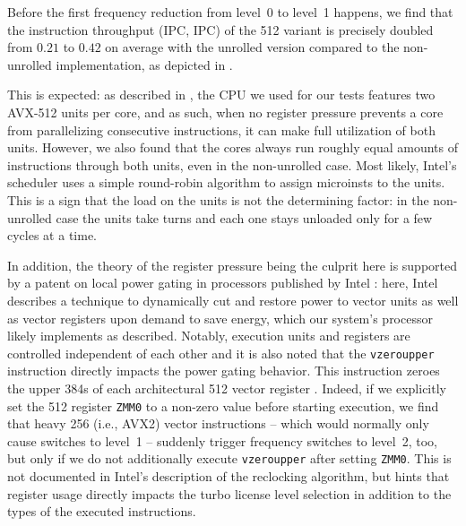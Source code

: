 Before the first frequency reduction from level~0 to level~1 happens, we find that the instruction throughput (\acrlong{IPC}, \acrshort{IPC}) of the \SI[number-unit-product=-]{512}{\bit} variant is precisely doubled from $0.21$ to $0.42$ on average with the unrolled version compared to the non-unrolled implementation, as depicted in .

This is expected: as described in , the \gls{CPU} we used for our tests features two \gls{AVX-512} units per core, and as such, when no register pressure prevents a core from parallelizing consecutive instructions, it can make full utilization of both units. However, we also found that the cores always run roughly equal amounts of instructions through both units, even in the non-unrolled case. Most likely, Intel's scheduler uses a simple round-robin algorithm to assign \glspl{microinst} to the units. This is a sign that the load on the units is not the determining factor: in the non-unrolled case the units take turns and each one stays unloaded only for a few cycles at a time.

In addition, the theory of the register pressure being the culprit here is supported by a patent on local power gating in processors published by Intel \cite{bonen2016performing}: here, Intel describes a technique to dynamically cut and restore power to vector units as well as vector registers upon demand to save energy, which our system's processor likely implements as described. Notably, execution units and registers are controlled independent of each other and it is also noted that the \texttt{vzeroupper} instruction directly impacts the power gating behavior. This instruction zeroes the upper \SI{384}{\bit}s of each architectural \SI[number-unit-product=-]{512}{\bit} vector register \cite{intelsdminstructionreference}. Indeed, if we explicitly set the \SI[number-unit-product=-]{512}{\bit} register \texttt{ZMM0} to a non-zero value before starting execution, we find that heavy \SI[number-unit-product=-]{256}{\bit} (i.e., \gls{AVX2}) vector instructions -- which would normally only cause switches to level~1 -- suddenly trigger frequency switches to level~2, too, but only if we do not additionally execute \texttt{vzeroupper} after setting \texttt{ZMM0}. This is not documented in Intel's description of the reclocking algorithm, but hints that register usage directly impacts the turbo license level selection in addition to the types of the executed instructions.

